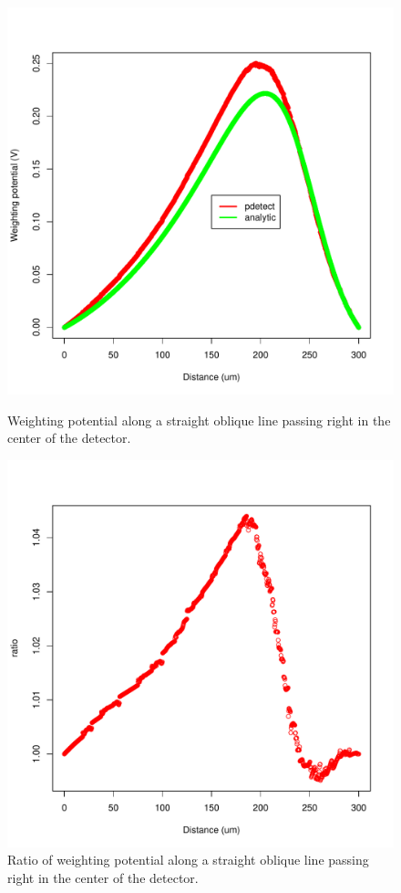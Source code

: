 \documentclass[11pt]{article}
\begin{document}
	\begin{figure}[H]
		\begin{minipage}[b]{.46\linewidth}
			\center
			\includegraphics[scale=0.5]{images/annexe/oblique.pdf}
			\caption{Weighting potential along a straight oblique line passing right in the center of
					the detector.}
			\label{fig:oblique}
		\end{minipage} \hfill
		\begin{minipage}[b]{.46\linewidth}
			\center
			\includegraphics[scale=0.5]{images/annexe/oblique_ratio.pdf}
			\caption{Ratio of weighting potential along a straight oblique line passing right in the
					center of the detector.}
			\label{fig:oblique_ratio}
		\end{minipage}
	\end{figure}
\end{document}
